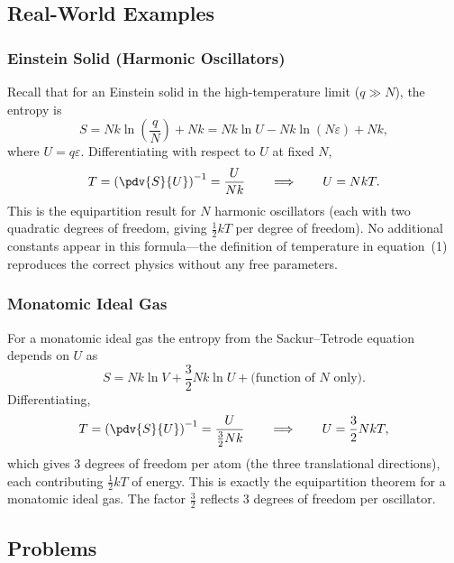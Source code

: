 
\subsection{Real-World Examples}

\subsubsection*{Einstein Solid (Harmonic Oscillators)}

Recall that for an Einstein solid in the high-temperature limit ($q \gg N$), the entropy is
\[
  S = Nk\ln\!\left(\frac{q}{N}\right) + Nk = Nk\ln U - Nk\ln(N\varepsilon) + Nk,
\]
where $U = q\varepsilon$. Differentiating with respect to $U$ at fixed $N$,
\[
  T = \left(\pdv{S}{U}\right)^{-1} = \frac{U}{Nk}
  \qquad\Longrightarrow\qquad U = NkT.
\]
This is the equipartition result for $N$ harmonic oscillators (each with two quadratic degrees
of freedom, giving $\frac{1}{2}kT$ per degree of freedom). No additional constants appear in
this formula---the definition of temperature in equation~(1) reproduces the correct physics
without any free parameters.

\subsubsection*{Monatomic Ideal Gas}

For a monatomic ideal gas the entropy from the Sackur--Tetrode equation depends on $U$ as
\[
  S = Nk\ln V + \frac{3}{2}Nk\ln U + \text{(function of }N\text{ only)}.
\]
Differentiating,
\[
  T = \left(\pdv{S}{U}\right)^{-1} = \frac{U}{\tfrac{3}{2}Nk}
  \qquad\Longrightarrow\qquad U = \frac{3}{2}NkT,
\]
which gives 3 degrees of freedom per atom (the three translational directions), each
contributing $\frac{1}{2}kT$ of energy. This is exactly the equipartition theorem for a
monatomic ideal gas. The factor $\frac{3}{2}$ reflects 3 degrees of freedom per oscillator.


\subsection*{Problems}



